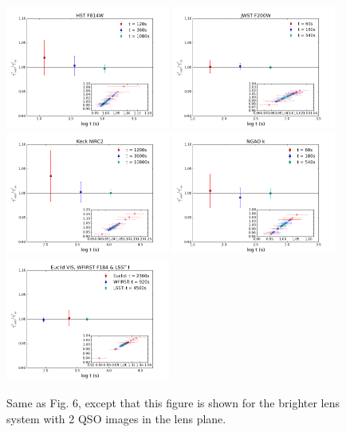 \documentclass[a4paper,11pt]{article}
\begin{document}
\begin{figure}
\begin{center}
\includegraphics[width=0.48\textwidth]{figures/gamma_0330_2QSOimages_HST.png}
\includegraphics[width=0.48\textwidth]{figures/gamma_0330_2QSOimages_JWST.png} \\
\includegraphics[width=0.48\textwidth]{figures/gamma_0330_2QSOimages_Keck.png}
\includegraphics[width=0.48\textwidth]{figures/gamma_0330_2QSOimages_NGAO.png} \\
\includegraphics[width=0.48\textwidth]{figures/gamma_0330_2QSOimages_E_W_L.png}
\end{center}
\caption{Same as Fig. 6, except that this figure is shown for the brighter lens system with 2 QSO images in the lens plane.} 
\label{fig:gamma_brighter_2QSOimages}
\end{figure}
\end{document}
